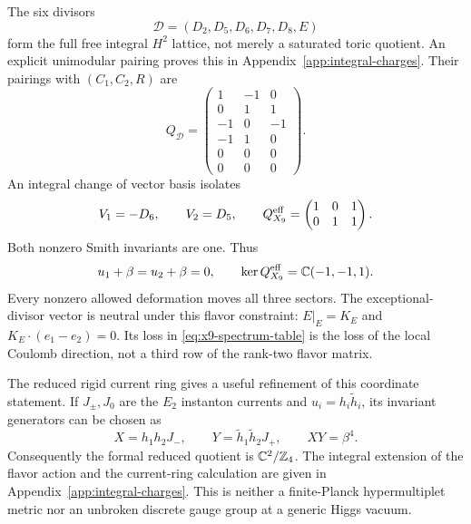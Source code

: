 The six divisors
\begin{equation}
 \mathcal D=(D_2,D_5,D_6,D_7,D_8,E)
 \label{eq:x9-divisor-basis}
\end{equation}
form the full free integral $H^2$ lattice, not merely a saturated
toric quotient. An explicit unimodular pairing proves this in
Appendix~\ref{app:integral-charges}. Their pairings with
$(C_1,C_2,R)$ are
\begin{equation}
 Q_{\mathcal D}=
 \begin{pmatrix}1&-1&0\\0&1&1\\-1&0&-1\\-1&1&0\\0&0&0\\0&0&0\end{pmatrix}.
 \label{eq:x9-full-matrix}
\end{equation}
An integral change of vector basis isolates
\begin{equation}
 V_1=-D_6,\qquad V_2=D_5,\qquad
 Q_{X_9}^{\rm eff}=\begin{pmatrix}1&0&1\\0&1&1\end{pmatrix}.
 \label{eq:x9-effective-vectors}
\end{equation}
Both nonzero Smith invariants are one. Thus
\begin{equation}
 u_1+\beta=u_2+\beta=0,\qquad
 \ker Q_{X_9}^{\rm eff}=\mathbb C(-1,-1,1).
 \label{eq:x9-moment-maps}
\end{equation}
Every nonzero allowed deformation moves all three sectors. The
exceptional-divisor vector is neutral under this flavor constraint:
$E|_E=K_E$ and $K_E\cdot(e_1-e_2)=0$. Its loss in
\eqref{eq:x9-spectrum-table} is the loss of the local Coulomb
direction, not a third row of the rank-two flavor matrix.

The reduced rigid current ring gives a useful refinement of this
coordinate statement. If $J_\pm,J_0$ are the $E_2$ instanton currents
and $u_i=h_i\widetilde h_i$, its invariant generators can be chosen as
\begin{equation}
 X=h_1h_2J_-,\qquad Y=\widetilde h_1\widetilde h_2J_+,\qquad
 XY=\beta^4.
 \label{eq:x9-dressed-generators}
\end{equation}
Consequently the formal reduced quotient is $\mathbb C^2/\mathbb Z_4$.
The integral extension of the flavor action and the current-ring
calculation are given in Appendix~\ref{app:integral-charges}.
This is neither a finite-Planck hypermultiplet metric nor an
unbroken discrete gauge group at a generic Higgs vacuum.

